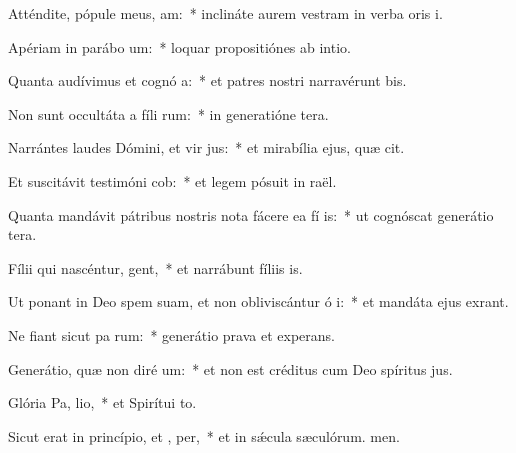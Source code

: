 \item Atténdite, pópule meus,  am:~* inclináte aurem vestram in verba oris i.
\item Apériam in parábo  um:~* loquar propositiónes ab intio.
\item Quanta audívimus et cognó a:~* et patres nostri narravérunt bis.
\item Non sunt occultáta a fíli rum:~* in generatióne tera.
\item Narrántes laudes Dómini, et vir jus:~* et mirabília ejus, quæ cit.
\item Et suscitávit testimóni  cob:~* et legem pósuit in raël.
\item Quanta mandávit pátribus nostris nota fácere ea fí is:~* ut cognóscat generátio tera.
\item Fílii qui nascéntur,  gent,~* et narrábunt fíliis is.
\item Ut ponant in Deo spem suam, et non obliviscántur ó i:~* et mandáta ejus exrant.
\item Ne fiant sicut pa rum:~* generátio prava et experans.
\item Generátio, quæ non diré  um:~* et non est créditus cum Deo spíritus jus.
\item Glória Pa,  lio,~* et Spirítui to.
\item Sicut erat in princípio, et ,  per,~* et in sǽcula sæculórum. men.
